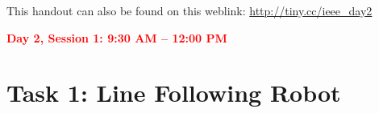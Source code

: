 \documentclass[11pt]{article}
\def\bluehref#1#2{\href{#1}{\color{blue} #2}}
\begin{document}



\noindent This handout can also be found on this weblink: \bluehref{http://tiny.cc/ieee\_day2}{http://tiny.cc/ieee\_day2}

\vspace{0.5cm}
\noindent \textcolor{red}{\bf\Large Day 2, Session 1: 9:30 AM -- 12:00 PM} 

\section*{Task 1: Line Following Robot}
\end{document}
